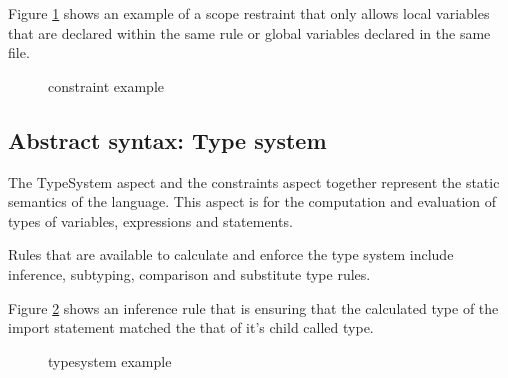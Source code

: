 Figure \ref{fig:constraint_example} shows an example of a scope restraint that only allows local variables that are declared within the same rule or global variables declared in the same file.

\begin{figure}[h]
    \centering
    \caption{constraint example}
    \label{fig:constraint_example}
\end{figure}
 

\subsection{Abstract syntax: Type system}
The TypeSystem aspect and the constraints aspect together represent the static semantics of the language.
This aspect is for the computation and evaluation of types of variables, expressions and statements.

Rules that are available to calculate and enforce the type system include inference, subtyping, comparison and substitute type rules.

Figure \ref{fig:typesystem_example} shows an inference rule that is ensuring that the calculated type of the import statement matched the that of it's child called type.

\begin{figure}[h]
    \centering
    \caption{typesystem example}
    \label{fig:typesystem_example}
\end{figure}
 

